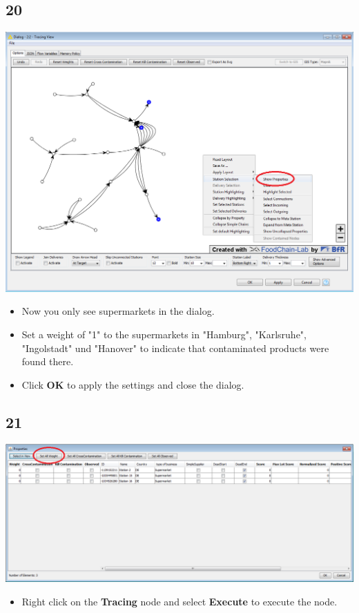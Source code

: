 \documentclass{beamer}
\begin{document}
\subsection{20}
\begin{frame}
	\begin{center}
  		\includegraphics[height=0.6\textheight]{20.png}
	\end{center}
	\begin{itemize}
		\item Now you only see supermarkets in the dialog.
		\item Set a weight of "1" to the supermarkets in "Hamburg", "Karlsruhe", "Ingolstadt" und "Hanover" to indicate that contaminated products were found there.
		\item Click \textbf{OK} to apply the settings and close the dialog.
	\end{itemize}
\end{frame}

\subsection{21}
\begin{frame}
	\begin{center}
  		\includegraphics[height=0.6\textheight]{21.png}
	\end{center}
	\begin{itemize}
		\item Right click on the \textbf{Tracing} node and select \textbf{Execute} to execute the node.
	\end{itemize}
\end{frame}
\end{document}
